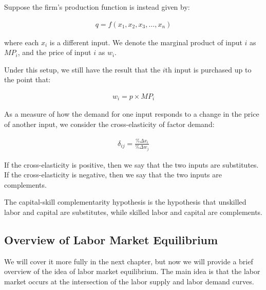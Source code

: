 Suppose the firm's production function 
is instead given by:

\begin{align}
    q=f\left(x_1, x_2, x_3, \ldots, x_n\right)
\end{align}

where each $x_i$ is a different input.
We denote the marginal product of input $i$ as $MP_i$,
and the price of input $i$ as $w_i$.

Under this setup, we still have the result that
the $i$th input is purchased up to the point that:

\begin{align}
    w_i=p \times MP_i
\end{align}

\begin{definition} 
    
    As a measure of how the demand for one input 
    responds to a change in the price of another input, 
    we consider the cross-elasticity of factor demand:

    \begin{align}
        \delta_{ij} = \frac{ \% \Delta x_i}{\% \Delta w_j}
    \end{align}

\end{definition}

If the cross-elasticity is positive, then we say that 
the two inputs are substitutes.
If the cross-elasticity is negative, then we say that
the two inputs are complements.

\begin{definition}
    
    The capital-skill complementarity hypothesis
    is the hypothesis that unskilled labor 
    and capital are substitutes, while
    skilled labor and capital are complements.
    
\end{definition}

\subsection{Overview of Labor Market Equilibrium}

We will cover it more fully in the next 
chapter, but now we will provide a brief overview of 
the idea of labor market equilibrium.
The main idea is that the labor market
occurs at the intersection of 
the labor supply and labor demand curves.

